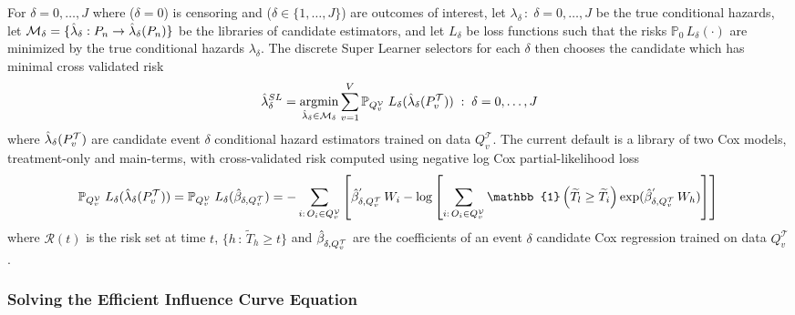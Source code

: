 For \(\delta = 0, \dots, J\) where (\(\delta = 0\)) is censoring and (\(\delta \in \{1, \dots, J\}\)) are outcomes of interest, let \(\lambda_{\delta} \,:\; \delta = 0, \dots, J\) be the true conditional hazards, let \(\mathcal{M}_\delta = \{\Hat{\lambda}_\delta : P_n \to \Hat\lambda_{\delta}(P_n)\}\) be the libraries of candidate estimators, and let \(L_{\delta}\) be loss functions such that the risks \(\mathbb{P}_0\,L_{\delta}(\cdot)\) are minimized by the true conditional hazards \(\lambda_{\delta}\). The discrete Super Learner selectors for each \(\delta\) then chooses the candidate which has minimal cross validated risk \begin{equation}
\Hat{\lambda}_\delta^{SL} = \mathop{\mathrm{argmin}}_{\Hat{\lambda}_\delta \in \mathcal{M}_\delta} \sum_{v = 1}^{V} \mathbb{P}_{Q^\mathcal{V}_v} \; L_{ \delta}(\Hat{\lambda}_{\delta}(P^\mathcal{T}_v)) \;:\; \delta = 0, \dots, J\label{hazsl}
\end{equation} where \(\Hat{\lambda}_\delta(P^\mathcal{T}_v)\) are candidate event \(\delta\) conditional hazard estimators trained on data \(Q^\mathcal{T}_v\). The current  default is a library of two Cox models, treatment-only and main-terms, with cross-validated risk computed using negative log Cox partial-likelihood loss \citep{cox_partial_1975, rytgaard_targeted_2022} \[ \mathbb{P}_{Q^\mathcal{V}_v} \; L_{ \delta}(\Hat{\lambda}_{\delta}(P^\mathcal{T}_v)) =  \mathbb{P}_{Q^\mathcal{V}_v} \; L_{ \delta}(\Hat{\beta}_{\delta, Q^\mathcal{T}_v}) = - \sum_{i: \, O_i \in Q^\mathcal{V}_v} \left[\Hat{\beta}^{'}_{\delta, Q^\mathcal{T}_v}\,{W}_i - \log\left[\sum_{i: \, O_i \in Q^\mathcal{V}_v} \mathbb{1}\left(\widetilde T_l \geq \widetilde T_i\right) \exp(\Hat{\beta}^{'}_{\delta, Q^\mathcal{T}_v}\,{W}_h)\right]\right] \,\] where \(\mathcal{R}(t)\) is the risk set at time \(t\), \(\{h \,:\, \widetilde T_h \geq t\}\) and \(\Hat{\beta}^{}_{\delta, Q^\mathcal{T}_v}\) are the coefficients of an event \(\delta\) candidate Cox regression trained on data \(Q^\mathcal{T}_v\).

\hypertarget{sec-eic}{%
\subsubsection{Solving the Efficient Influence Curve Equation}\label{sec-eic}}


